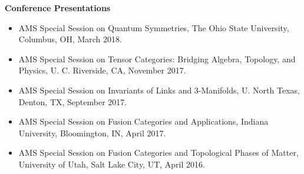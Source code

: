 \documentclass[11pt]{article}
\begin{document}
    


  


  {\large \textbf{Conference Presentations}}

  \begin{itemize}
    \item[] AMS Special Session on Quantum Symmetries, The Ohio State University, Columbus, OH, March 2018.
    
    \item[] AMS Special Session on Tensor Categories: Bridging Algebra, Topology, and Physics, U. C. Riverside, CA, November 2017.

    \item[] AMS Special Session on Invariants of Links and 3-Manifolds, U. North Texas, Denton, TX, September 2017.

    \item[] AMS Special Session on Fusion Categories and Applications, Indiana University, Bloomington, IN, April 2017.

    \item[] AMS Special Session on Fusion Categories and Topological Phases of Matter, University of Utah, Salt Lake City, UT, April 2016.
  \end{itemize}
  
\end{document}
